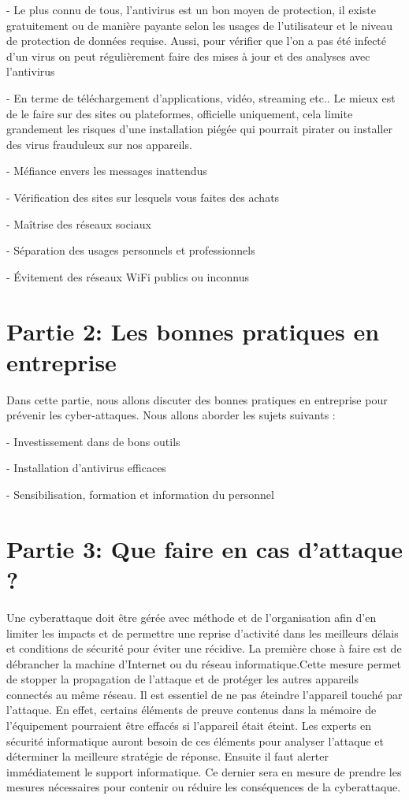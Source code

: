 \documentclass[a4paper,11pt]{article}
\begin{document}
  - Le plus connu de tous, l’antivirus est un bon moyen de protection, il existe gratuitement ou de manière payante selon les usages de l’utilisateur et le niveau de protection de données requise. Aussi, pour vérifier que l’on a pas été infecté d’un virus on peut régulièrement faire des mises à jour et des analyses avec l’antivirus


  - En terme de téléchargement d’applications, vidéo, streaming etc.. Le mieux est de le faire sur des sites ou plateformes, officielle uniquement, cela limite grandement les risques d’une installation piégée qui pourrait pirater ou installer des virus frauduleux sur nos appareils.

  - Méfiance envers les messages inattendus

  - Vérification des sites sur lesquels vous faites des achats

  - Maîtrise des réseaux sociaux

  - Séparation des usages personnels et professionnels

  - Évitement des réseaux WiFi publics ou inconnus


\section{Partie 2: Les bonnes pratiques en entreprise}

Dans cette partie, nous allons discuter des bonnes pratiques en entreprise pour prévenir les cyber-attaques. Nous allons aborder les sujets suivants :

  - Investissement dans de bons outils

  - Installation d’antivirus efficaces

  - Sensibilisation, formation et information du personnel


\section{Partie 3: Que faire en cas d’attaque ?}

Une cyberattaque doit être gérée avec méthode et de l’organisation afin d’en limiter les impacts et de permettre une reprise d’activité dans les meilleurs délais et conditions de sécurité pour éviter une récidive.
La première chose à faire est de débrancher la machine d’Internet ou du réseau informatique.Cette mesure permet de stopper la propagation de l’attaque et de protéger les autres appareils connectés au même réseau.
Il est essentiel de ne pas éteindre l’appareil touché par l’attaque. En effet, certains éléments de preuve contenus dans la mémoire de l’équipement pourraient être effacés si l’appareil était éteint. Les experts en sécurité informatique auront besoin de ces éléments pour analyser l’attaque et déterminer la meilleure stratégie de réponse.
Ensuite il faut alerter immédiatement le support informatique. Ce dernier sera en mesure de prendre les mesures nécessaires pour contenir ou réduire les conséquences de la cyberattaque.
\end{document}
